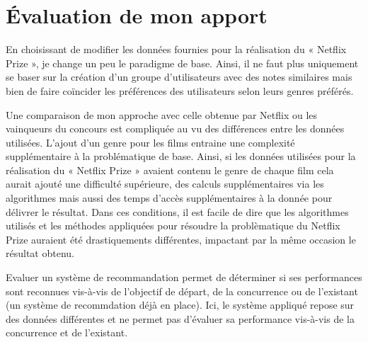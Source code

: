\chapter{Évaluation de mon apport}

En choisissant de modifier les données fournies pour la réalisation du « Netflix Prize », je change un peu le paradigme de base. Ainsi, il ne faut plus uniquement se baser sur la création d'un groupe d’utilisateurs avec des notes similaires mais bien de faire coïncider les préférences des utilisateurs selon leurs genres préférés. 

\vspace{5mm}

Une comparaison de mon approche avec celle obtenue par Netflix ou les vainqueurs du concours est compliquée au vu des différences entre les données utilisées. L’ajout d’un genre pour les films entraine une complexité supplémentaire à la problématique de base. Ainsi, si les données utilisées pour la réalisation du « Netflix Prize » avaient contenu le genre de chaque film cela aurait ajouté une difficulté supérieure, des calculs supplémentaires via les algorithmes mais aussi des temps d'accès supplémentaires à la donnée pour délivrer le résultat. Dans ces conditions, il est facile de dire que les algorithmes utilisés et les méthodes appliquées pour résoudre la problèmatique du Netflix Prize auraient été drastiquements différentes, impactant par la même occasion le résultat obtenu. 

\vspace{5mm}

Evaluer un système de recommandation permet de déterminer si ses performances sont reconnues vis-à-vis de l'objectif de départ, de la concurrence ou de l'existant (un système de recommdation déjà en place). Ici, le système appliqué repose sur des données différentes et ne permet pas d'évaluer sa performance vis-à-vis de la concurrence et de l'existant. 

\vspace{5mm}

